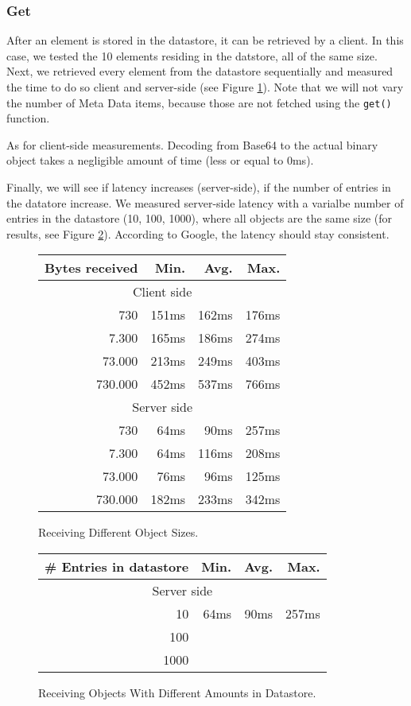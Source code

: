 \subsubsection{Get}
After an element is stored in the datastore, it can be retrieved by a client.
In this case, we tested the 10 elements residing in the datstore, all of the
same size. Next, we retrieved every element from the datastore sequentially and
measured the time to do so client and server-side (see Figure
\ref{get-obj-size}). Note that we will not vary the number of Meta Data items,
because those are not fetched using the \texttt{get()} function.

As for client-side measurements. Decoding from Base64 to the actual binary
object takes a negligible amount of time (less or equal to 0ms).

Finally, we will see if latency increases (server-side), if the number of
entries in the datatore increase. We measured server-side latency with a
varialbe number of entries in the datastore (10, 100, 1000), where all objects
are the same size (for results, see Figure \ref{get-obj-amt}). According to
Google, the latency should stay consistent.

\begin{figure}
\begin{tabular}{|r|r|r|r|}
\hline
Bytes received & Min. & Avg. & Max. \\
\hline
\multicolumn{4}{|c|}{Client side} \\
\hline
730 & 151ms & 162ms & 176ms \\
7.300 & 165ms & 186ms & 274ms \\
73.000 & 213ms & 249ms & 403ms \\
730.000 & 452ms & 537ms & 766ms \\
\hline
\multicolumn{4}{|c|}{Server side} \\
\hline
730 & 64ms & 90ms & 257ms \\
7.300 & 64ms & 116ms & 208ms \\
73.000 & 76ms & 96ms & 125ms \\
730.000 & 182ms & 233ms & 342ms \\
\hline
\end{tabular}
\caption{Receiving Different Object Sizes. \label{get-obj-size}}
\end{figure}

\begin{figure}
\begin{tabular}{|r|r|r|r|}
\hline
\# Entries in datastore & Min. & Avg. & Max. \\
\hline
\multicolumn{4}{|c|}{Server side} \\
\hline
10 & 64ms & 90ms & 257ms \\
100 & \\
1000 & \\
\hline
\end{tabular}
\caption{Receiving Objects With Different Amounts in Datastore.
\label{get-obj-amt}}
\end{figure}

